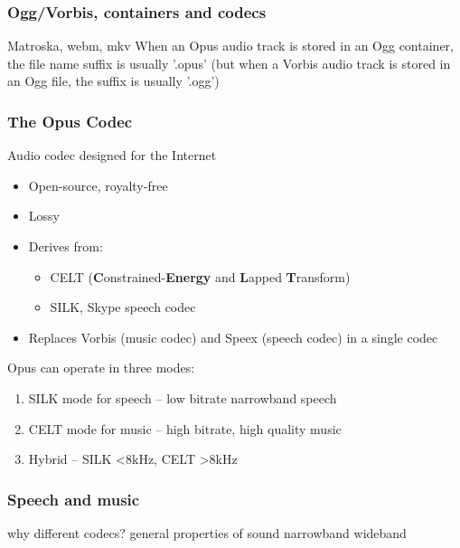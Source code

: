 \documentclass{beamer}
\begin{document}

\begin{frame}
	\frametitle{Ogg/Vorbis, containers and codecs}
	Matroska, webm, mkv
	When an Opus audio track is stored in an Ogg container, the file name suffix is usually '.opus' (but when a Vorbis audio track is stored in an Ogg file, the suffix is usually '.ogg')
\end{frame}

\begin{frame}
	\frametitle{The Opus Codec}
	Audio codec designed for the Internet
	\begin{itemize}
		\item
			Open-source, royalty-free
		\item
			Lossy
		\item
			Derives from:
			\begin{itemize}
				\item
					CELT (\textbf{C}onstrained-\textbf{Energy} and \textbf{L}apped \textbf{T}ransform)
				\item
					SILK, Skype speech codec
			\end{itemize}
		\item
			Replaces Vorbis (music codec) and Speex (speech codec) in a single codec
	\end{itemize}
	\vspace{1em}
	Opus can operate in three modes:
	\begin{enumerate}
		\item
			SILK mode for speech -- low bitrate narrowband speech
		\item
			CELT mode for music -- high bitrate, high quality music
		\item
			Hybrid -- SILK <8kHz, CELT >8kHz
	\end{enumerate}
\end{frame}


\begin{frame}
	\frametitle{Speech and music}
	why different codecs? general properties of sound
	narrowband
	wideband
\end{frame}
\end{document}

